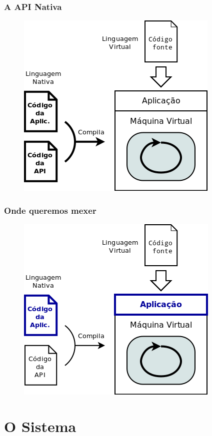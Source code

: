 \documentclass[brazil]{beamer}
\begin{document}
\begin{frame}[fragile]
  \frametitle{A API Nativa}
  \begin{figure}
    \includegraphics[height=.6\textheight]{images/nativo-vs-virtual-04.png}
  \end{figure}
\end{frame}
\begin{frame}[fragile]
  \frametitle{Onde queremos mexer}
  \begin{figure}
    \includegraphics[height=.6\textheight]{images/nativo-vs-virtual-05.png}
  \end{figure}
\end{frame}
\section{O Sistema}
\end{document}
